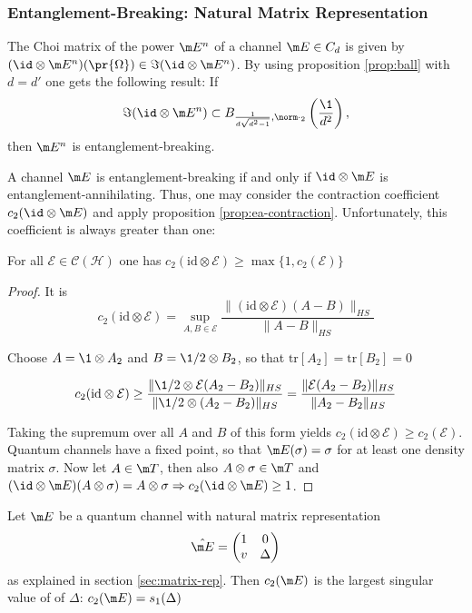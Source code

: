 \subsubsection{Entanglement-Breaking: Natural Matrix Representation}

The Choi matrix of the power $\m E^n$ of a channel $\m E \in C_d$ is given by $(\id \otimes \m E^n)(\pr{\Omega}) \in \Im
(\id \otimes \m E^n)$. By using proposition \ref{prop:ball} with $d=d'$ one gets the following result: If 
\begin{align}
    \Im(\id \otimes \m E^n) \subset B_{\frac{1}{d\sqrt{d^2-1}},\norm \cdot_2}\left(\frac{\1}{d^2}\right),
\end{align}
then $\m E^n$ is entanglement-breaking.

A channel $\m E$ is entanglement-breaking if and only if $\id \otimes \m E$ is entanglement-annihilating. Thus, one may consider the contraction coefficient $c_2(\id \otimes \m E)$ and apply proposition \ref{prop:ea-contraction}. Unfortunately, this coefficient is always greater than one:
\begin{prop}
For all $ \mathcal{E} \in \mathcal{C}(\mathcal{H})$ one has $ c_2(\text{id} \otimes \mathcal{E}) \ge \max \{1, c_2(\mathcal{E})\}$
\end{prop}
\begin{proof}
It is
$$ c_2(\text{id} \otimes \mathcal{E}) = \sup_{A, B \in \mathcal{{E}}} \frac{\|(\text{id} \otimes \mathcal{E})(A - B)\|_{HS}}{\|A - B\|_{HS}} $$

Choose $A = \1 \otimes A_2$ and $B = \1 / 2 \otimes B_2$, so that $\text{tr}[A_2] = \text{tr}[B_2] = 0$

$$ c_2(\text{id} \otimes \mathcal{E}) \ge \frac{\|\1 / 2 \otimes \mathcal{E}(A_2 - B_2)\|_{HS}}{\|\1 / 2 \otimes (A_2 - B_2)\|_{HS}} = \frac{\|\mathcal{E}(A_2 - B_2)\|_{HS}}{\|A_2 - B_2\|_{HS}} $$

Taking the supremum over all $A$ and $B$ of this form yields $c_2(\text{id} \otimes \mathcal{E}) \ge c_2(\mathcal{E})$.
Quantum channels have a fixed point, so that $\m E(\sigma) = \sigma$ for at least one density matrix $\sigma$. Now let $A\in \m T$, then also $A \otimes \sigma \in \m T$ and $(\id \otimes \m E)(A \otimes \sigma) = A \otimes \sigma \Rightarrow c_2(\id \otimes \m E) \geq 1$.
\end{proof}
\begin{lemma}
    Let $\m E$ be a quantum channel with natural matrix representation 
    \begin{align*}
    \hat{\m E}= \begin{pmatrix}
         1 & 0\\
        v & \Delta
    \end{pmatrix}
    \end{align*}
    as explained in section \ref{sec:matrix-rep}. Then $c_2(\m E)$ is the largest singular value of of $\Delta$: $c_2(\m E) = s_1(\Delta)$
\end{lemma}

